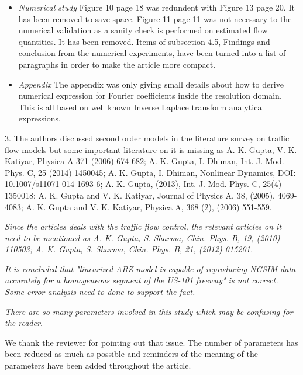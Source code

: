 \documentclass{article}
\begin{document}
\begin{itemize}
\item
\emph{Numerical study}
Figure 10 page 18 was redundent with Figure 13 page 20. It has been removed to save space.
Figure 11 page 11 was not necessary to the numerical validation as a sanity check is performed on estimated flow quantities. It has been removed.
Items of subsection 4.5, Findings and conclusion from the numerical experiments, have been turned into a list of paragraphs in order to make the article more compact.

\item
\emph{Appendix}
The appendix was only giving small details about how to derive numerical expression for Fourier coefficients inside the resolution domain. This is all based on well known Inverse Laplace transform analytical expressions.

\end{itemize}

\bigskip{}

3. The authors discussed second order models in the literature survey on traffic flow models but some important literature on it is missing as A. K. Gupta, V. K. Katiyar, Physica A 371 (2006) 674-682;  A. K. Gupta, I. Dhiman, Int. J. Mod. Phys. C, 25 (2014) 1450045; A. K. Gupta, I. Dhiman, Nonlinear Dynamics, DOI: 10.1007/s11071-014-1693-6; A. K. Gupta, (2013), Int. J. Mod. Phys. C, 25(4) 1350018; A. K. Gupta and V. K. Katiyar, Journal of Physics A, 38, (2005), 4069-4083; A. K. Gupta and V. K. Katiyar, Physica A, 368 (2), (2006) 551-559.

\bigskip{}

\emph{
Since the articles deals with the traffic flow control, the relevant articles on it need to be mentioned as A. K. Gupta, S. Sharma, Chin. Phys. B, 19, (2010) 110503; A. K. Gupta, S. Sharma, Chin. Phys. B, 21, (2012) 015201.
}

\bigskip{}

\emph{
It is concluded that "linearized ARZ model is capable of reproducing NGSIM data accurately for a homogeneous segment of the US-101 freeway" is not correct. Some error analysis need to done to support the fact.
}

\bigskip{}

\emph{
There are so many parameters involved in this study which may be confusing for the reader.
}

We thank the reviewer for pointing out that issue. The number of parameters has been reduced as much as possible and reminders of the meaning of the parameters have been added throughout the article.
\end{document}
